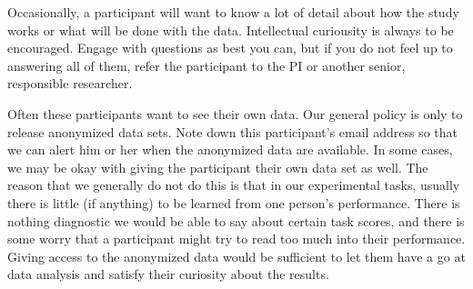 \documentclass[12pt,]{book}
\theoremstyle{definition}
\theoremstyle{definition}
\theoremstyle{definition}
\theoremstyle{remark}
\begin{document}
Occasionally, a participant will want to know a lot of detail about how
the study works or what will be done with the data. Intellectual
curiousity is always to be encouraged. Engage with questions as best you
can, but if you do not feel up to answering all of them, refer the
participant to the PI or another senior, responsible researcher.

Often these participants want to see their own data. Our general policy
is only to release anonymized data sets. Note down this participant's
email address so that we can alert him or her when the anonymized data
are available. In some cases, we may be okay with giving the participant
their own data set as well. The reason that we generally do not do this
is that in our experimental tasks, usually there is little (if anything)
to be learned from one person's performance. There is nothing diagnostic
we would be able to say about certain task scores, and there is some
worry that a participant might try to read too much into their
performance. Giving access to the anonymized data would be sufficient to
let them have a go at data analysis and satisfy their curiosity about
the results.


\end{document}
